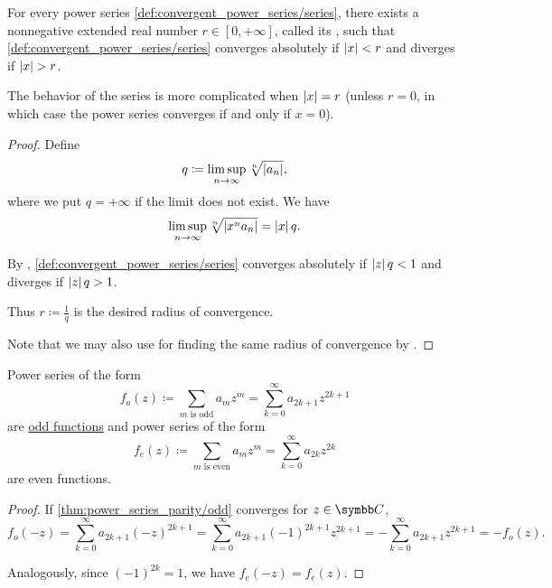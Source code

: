 \begin{theorem}\label{thm:power_series_radius_of_convergence}
  For every power series \eqref{def:convergent_power_series/series}, there exists a nonnegative extended real number \( r \in [0, +\infty] \), called its , such that \eqref{def:convergent_power_series/series} converges absolutely if \( \left\vert x \right\vert < r \) and diverges if \( \left\vert x \right\vert > r \).

  The behavior of the series is more complicated when \( \left\vert x \right\vert = r \) (unless \( r = 0 \), in which case the power series converges if and only if \( x = 0 \)).
\end{theorem}
\begin{proof}
  Define
  \begin{equation*}
    q \coloneqq \limsup_{n \to \infty} \sqrt[n]{\left\vert a_n \right\vert},
  \end{equation*}
  where we put \( q = +\infty \) if the limit does not exist. We have
  \begin{equation*}
    \limsup_{n \to \infty} \sqrt[n]{\left\vert x^n a_n \right\vert} = \left\vert x \right\vert q.
  \end{equation*}

  By , \eqref{def:convergent_power_series/series} converges absolutely if \( \left\vert z \right\vert q < 1 \) and diverges if \( \left\vert z \right\vert q > 1 \).

  Thus \( r \coloneqq \tfrac 1 q \) is the desired radius of convergence.

  Note that we may also use  for finding the same radius of convergence by .
\end{proof}

\begin{proposition}\label{thm:power_series_parity}
  Power series of the form
  \begin{equation}\label{thm:power_series_parity/odd}
    f_o(z) \coloneqq \sum_{m \text{ is odd}} a_m z^m = \sum_{k=0}^\infty a_{2k+1} z^{2k+1}
  \end{equation}
  are \hyperref[def:function_pairity]{odd functions} and power series of the form
  \begin{equation}\label{thm:power_series_parity/even}
    f_e(z) \coloneqq \sum_{m \text{ is even}} a_m z^m = \sum_{k=0}^\infty a_{2k} z^{2k}
  \end{equation}
  are even functions.
\end{proposition}
\begin{proof}
  If \eqref{thm:power_series_parity/odd} converges for \( z \in \BC \),
  \begin{equation*}
    f_o(-z)
    =
    \sum_{k=0}^\infty a_{2k+1} (-z)^{2k+1}
    =
    \sum_{k=0}^\infty a_{2k+1} (-1)^{2k+1} z^{2k+1}
    =
    - \sum_{k=0}^\infty a_{2k+1} z^{2k+1}
    =
    - f_o(z).
  \end{equation*}

  Analogously, since \( (-1)^{2k} = 1 \), we have \( f_e(-z) = f_e(z) \).
\end{proof}

